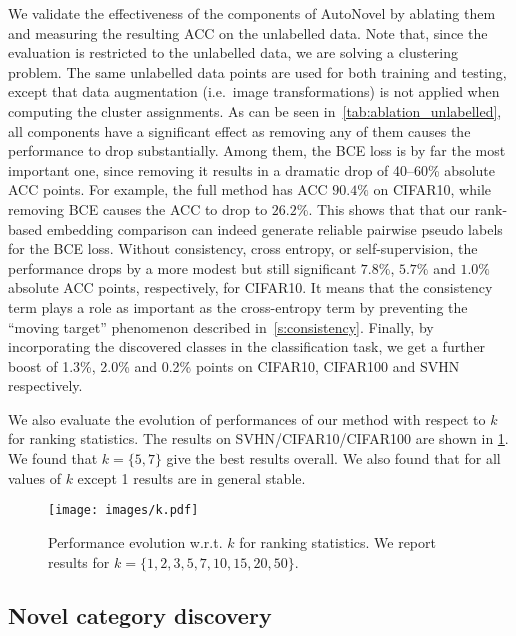 We validate the effectiveness of the components of AutoNovel by ablating them and measuring the resulting ACC on the unlabelled data.
Note that, since the evaluation is restricted to the unlabelled data, we are solving a clustering problem. The same unlabelled data points are used for both training and testing, except that data augmentation (i.e.~image transformations) is not applied when computing the cluster assignments.
As can be seen in~\cref{tab:ablation_unlabelled}, all components have a significant effect as removing any of them causes the performance to drop substantially.
Among them, the BCE loss is by far the most important one, since removing it results in a dramatic drop of 40--60\% absolute ACC points.
For example, the full method has ACC $90.4\%$ on CIFAR10, while removing BCE causes the ACC to drop to $26.2\%$.
This shows that that our rank-based embedding comparison can indeed generate reliable pairwise pseudo labels for the BCE loss.
Without consistency, cross entropy, or self-supervision, the performance drops by a more modest but still significant $7.8\%$, $5.7\%$ and $1.0\%$ absolute ACC points, respectively, for CIFAR10.
It means that the consistency term plays a role as important as the cross-entropy term by preventing the ``moving target'' phenomenon described in~\cref{s:consistency}.
Finally, by incorporating the discovered classes in the classification task, we get a further boost of 1.3\%, 2.0\% and 0.2\% points on CIFAR10, CIFAR100 and SVHN respectively.

We also evaluate the evolution of performances of our method with respect to $k$ for ranking statistics. The results on SVHN/CIFAR10/CIFAR100 are shown in \cref{fig:k}. We found that $k=\{5,7\}$ give the best results overall. We also found that for all values of $k$ except 1 results are in general stable.
\begin{figure}
    \centering
    \texttt{[image: images/k.pdf]}
    \caption{Performance evolution w.r.t. $k$ for ranking statistics. We report results for $k=\{1,2,3,5,7,10,15,20,50\}$.}
    \label{fig:k}
\end{figure}

\subsection{Novel category discovery}

